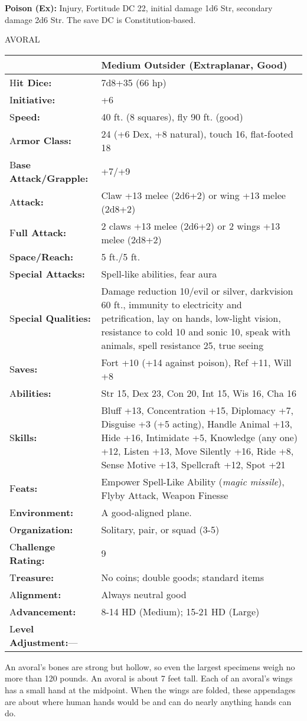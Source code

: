 \documentclass{article}
\begin{document}
\textbf{Poison (Ex): }Injury, Fortitude DC 22, initial damage 1d6 Str, secondary 
damage 2d6 Str. The save DC is Constitution-based.

\vspace{12pt}
{\LARGE{}AVORAL}

\begin{tabular}{|>{\raggedright}p{91pt}|>{\raggedright}p{234pt}|}
\hline
  & Medium Outsider (Extraplanar, Good)\tabularnewline
\hline
H\textbf{it Dice:} & 7d8+35 (66 hp)\tabularnewline
\hline
I\textbf{nitiative:} & +6\tabularnewline
\hline
S\textbf{peed:} & 40 ft. (8 squares), fly 90 ft. (good)\tabularnewline
\hline
A\textbf{rmor Class:} & 24 (+6 Dex, +8 natural), touch 16, flat-footed 18\tabularnewline
\hline
B\textbf{ase Attack/Grapple:} & +7/+9\tabularnewline
\hline
A\textbf{ttack:} & Claw +13 melee (2d6+2) or wing +13 melee (2d8+2)\tabularnewline
\hline
F\textbf{ull Attack:} & 2 claws +13 melee (2d6+2) or 2 wings +13 melee (2d8+2)\tabularnewline
\hline
S\textbf{pace/Reach:} & 5 ft./5 ft.\tabularnewline
\hline
S\textbf{pecial Attacks:} & Spell-like abilities, fear aura\tabularnewline
\hline
S\textbf{pecial Qualities:} & Damage reduction 10/evil or silver, darkvision 60 
ft., immunity to electricity and petrification, lay on hands, low-light vision, 
resistance to cold 10 and sonic 10, speak with animals, spell resistance 25, true 
seeing\tabularnewline
\hline
S\textbf{aves:} & Fort +10 (+14 against poison), Ref +11, Will +8\tabularnewline
\hline
A\textbf{bilities:} & Str 15, Dex 23, Con 20, Int 15, Wis 16, Cha 16\tabularnewline
\hline
S\textbf{kills:} & Bluff +13, Concentration +15, Diplomacy +7, Disguise +3 (+5 
acting), Handle Animal +13, Hide +16, Intimidate +5, Knowledge (any one) +12, Listen 
+13, Move Silently +16, Ride +8, Sense Motive +13, Spellcraft +12, Spot +21\tabularnewline
\hline
F\textbf{eats:} & Empower Spell-Like Ability (\textit{magic missile}), Flyby Attack, 
Weapon Finesse\tabularnewline
\hline
E\textbf{nvironment:} & A good-aligned plane.\tabularnewline
\hline
O\textbf{rganization:} & Solitary, pair, or squad (3-5)\tabularnewline
\hline
C\textbf{hallenge Rating:} & 9\tabularnewline
\hline
T\textbf{reasure:} & No coins; double goods; standard items\tabularnewline
\hline
A\textbf{lignment:} & Always neutral good\tabularnewline
\hline
A\textbf{dvancement:} & 8-14 HD (Medium); 15-21 HD (Large)\tabularnewline
\hline
L\textbf{evel Adjustment:}--- & \tabularnewline
\hline
\end{tabular}

An avoral's bones are strong but hollow, so even the largest specimens weigh no 
more than 120 pounds. An avoral is about 7 feet tall. Each of an avoral's wings 
has a small hand at the midpoint. When the wings are folded, these appendages are 
about where human hands would be and can do nearly anything hands can do.
\end{document}
